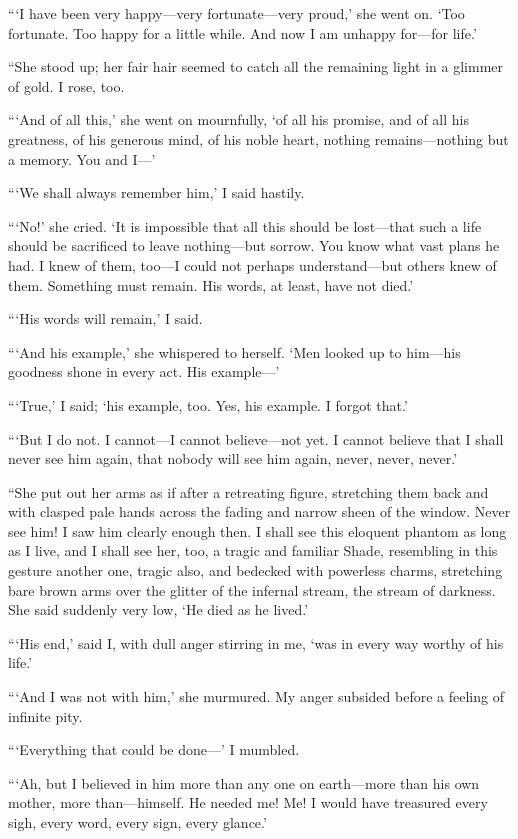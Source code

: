 \documentclass[12pt]{report}
\begin{document}
```I have been very happy---very fortunate---very proud,' she went on.
`Too fortunate. Too happy for a little while. And now I am unhappy
for---for life.'

``She stood up; her fair hair seemed to catch all the remaining light in
a glimmer of gold. I rose, too.

```And of all this,' she went on mournfully, `of all his promise, and of
all his greatness, of his generous mind, of his noble heart, nothing
remains---nothing but a memory. You and I---'

```We shall always remember him,' I said hastily.

```No!' she cried. `It is impossible that all this should be lost---that
such a life should be sacrificed to leave nothing---but sorrow. You know
what vast plans he had. I knew of them, too---I could not perhaps
understand---but others knew of them. Something must remain. His words,
at least, have not died.'

```His words will remain,' I said.

```And his example,' she whispered to herself. `Men looked up to
him---his goodness shone in every act. His example---'

```True,' I said; `his example, too. Yes, his example. I forgot that.'

```But I do not. I cannot---I cannot believe---not yet. I cannot believe
that I shall never see him again, that nobody will see him again, never,
never, never.'

``She put out her arms as if after a retreating figure, stretching them
back and with clasped pale hands across the fading and narrow sheen of
the window. Never see him! I saw him clearly enough then. I shall see
this eloquent phantom as long as I live, and I shall see her, too, a
tragic and familiar Shade, resembling in this gesture another one,
tragic also, and bedecked with powerless charms, stretching bare brown
arms over the glitter of the infernal stream, the stream of darkness.
She said suddenly very low, `He died as he lived.'

```His end,' said I, with dull anger stirring in me, `was in every way
worthy of his life.'

```And I was not with him,' she murmured. My anger subsided before a
feeling of infinite pity.

```Everything that could be done---' I mumbled.

```Ah, but I believed in him more than any one on earth---more than his
own mother, more than---himself. He needed me! Me! I would have
treasured every sigh, every word, every sign, every glance.'
\end{document}
